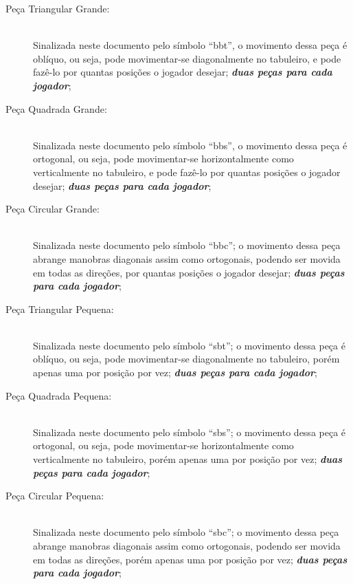 \begin{description}
  \item [Peça Triangular Grande:] \hfill\\ Sinalizada neste documento pelo símbolo ``\gls{bbt}'', o movimento dessa
    peça é oblíquo, ou seja, pode movimentar-se diagonalmente no tabuleiro, e pode fazê-lo por quantas posições o
    jogador desejar; \textbf{\textit{duas peças para cada jogador}};
  \item [Peça Quadrada Grande:] \hfill\\ Sinalizada neste documento pelo símbolo ``\gls{bbs}'', o movimento dessa peça
    é ortogonal, ou seja, pode movimentar-se horizontalmente como verticalmente no tabuleiro, e pode fazê-lo por
    quantas posições o jogador desejar; \textbf{\textit{duas peças para cada jogador}};
  \item [Peça Circular Grande:] \hfill\\ Sinalizada neste documento pelo símbolo ``\gls{bbc}''; o movimento dessa peça
    abrange manobras diagonais assim como ortogonais, podendo ser movida em todas as direções, por quantas posições o
    jogador desejar; \textbf{\textit{duas peças para cada jogador}};
  \item [Peça Triangular Pequena:] \hfill\\ Sinalizada neste documento pelo símbolo ``\gls{sbt}''; o movimento dessa
    peça é oblíquo, ou seja, pode movimentar-se diagonalmente no tabuleiro, porém apenas uma por posição por vez;
    \textbf{\textit{duas peças para cada jogador}};
  \item [Peça Quadrada Pequena:] \hfill\\ Sinalizada neste documento pelo símbolo ``\gls{sbs}''; o movimento dessa
    peça é ortogonal, ou seja, pode movimentar-se horizontalmente como verticalmente no tabuleiro, porém apenas uma
    por posição por vez; \textbf{\textit{duas peças para cada jogador}};
  \item [Peça Circular Pequena:] \hfill\\ Sinalizada neste documento pelo símbolo ``\gls{sbc}''; o movimento dessa
    peça abrange manobras diagonais assim como ortogonais, podendo ser movida em todas as direções, porém apenas uma
    por posição por vez; \textbf{\textit{duas peças para cada jogador}};
\end{description}

